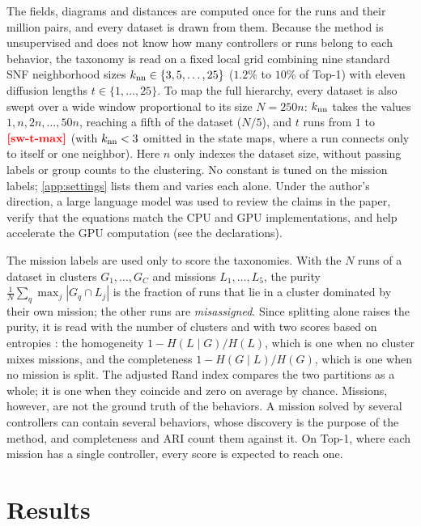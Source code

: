 \documentclass[pdflatex,sn-apa]{sn-jnl}
\begin{document}
The fields, diagrams and distances are computed once for the  runs and their  million
pairs, and every dataset is drawn from them. Because the method is unsupervised and does not know how many controllers or
runs belong to each behavior, the taxonomy is read on a fixed local grid combining nine standard SNF neighborhood sizes
$k_{\mathrm{nn}}\in\{3,5,\dots,25\}$ ($1.2\%$ to $10\%$ of Top-1) with eleven diffusion lengths $t\in\{1,\dots,25\}$. To map the
full hierarchy, every dataset is also swept over a wide window proportional to its size $N=250n$: $k_{\mathrm{nn}}$ takes the
values $1, n, 2n, \dots, 50n$, reaching a fifth of the dataset ($N/5$), and $t$ runs from $1$ to $\nm{sw-t-max}$ (with
$k_{\mathrm{nn}}<3$ omitted in the state maps, where a run connects only to itself or one neighbor). Here $n$ only indexes the
dataset size, without passing labels or group counts to the clustering. No constant is tuned on the mission labels;
\cref{app:settings} lists them and varies each alone. Under the author's direction, a large language model was used to
review the claims in the paper, verify that the equations match the CPU and GPU implementations, and help accelerate
the GPU computation (see the declarations).

The mission labels are used only to score the taxonomies. With the $N$ runs of a dataset in clusters
$G_1,\dots,G_C$ and missions $L_1,\dots,L_5$, the purity $\frac{1}{N}\sum_{q}\max_{j}|G_q\cap L_j|$ is the fraction of
runs that lie in a cluster dominated by their own mission; the other runs are \emph{misassigned}. Since splitting alone
raises the purity, it is read with the number of clusters and with two scores based on entropies
\citep{rosenberg2007vmeasure}: the homogeneity $1-H(L\mid G)/H(L)$, which is one when no cluster mixes missions, and the
completeness $1-H(G\mid L)/H(G)$, which is one when no mission is split. The adjusted Rand index
\citep[ARI;][]{hubert1985comparing} compares the two partitions as a whole; it is one when they coincide and zero on
average by chance. Missions, however, are not the ground truth of the behaviors. A mission solved by several
controllers can contain several behaviors, whose discovery is the purpose of the method, and completeness and ARI
count them against it. On Top-1, where each mission has a single controller, every score is expected to reach one.


\FloatBarrier
\section{Results}
\label{sec:results}
\end{document}
